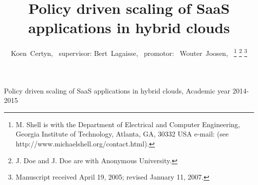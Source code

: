 \documentclass[journal]{IEEEtran}
\begin{document}
%
\title{Policy driven scaling of SaaS applications in hybrid clouds}
%
%
%

\author{Koen~Certyn,~\IEEEmembership{}
        supervisor: Bert~Lagaisse,~
        promotor: ~Wouter~Joosen,~%
\thanks{M. Shell is with the Department
of Electrical and Computer Engineering, Georgia Institute of Technology, Atlanta,
GA, 30332 USA e-mail: (see http://www.michaelshell.org/contact.html).}%
\thanks{J. Doe and J. Doe are with Anonymous University.}%
\thanks{Manuscript received April 19, 2005; revised January 11, 2007.}}

% 
%



%
{Policy driven scaling of SaaS applications in hybrid clouds, Academic year 2014-2015}
% 
\end{document}
